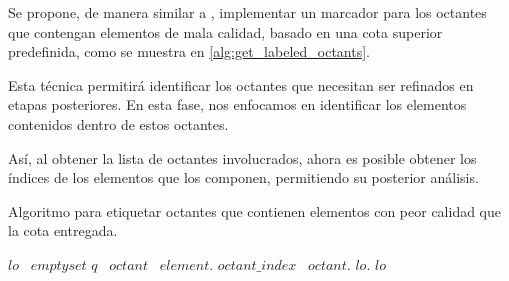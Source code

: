 %
%


Se propone, de manera similar a \cite{daines2018repairing}, implementar un marcador para los octantes que contengan elementos de mala calidad, basado en una cota superior predefinida, como se muestra en \autoref{alg:get_labeled_octants}.


Esta técnica permitirá identificar los octantes que necesitan ser refinados en etapas posteriores. En esta fase, nos enfocamos en identificar los elementos contenidos dentro de estos octantes.

Así, al obtener la lista de octantes involucrados, ahora es posible obtener los índices de los elementos que los componen, permitiendo su posterior análisis.


\begin{algorithm}
\caption{Algoritmo para etiquetar octantes que contienen elementos con peor calidad que la cota entregada.}\label{alg:get_labeled_octants} 
{
    $lo$ \gets \, $empty set$ \;
     {
        $q$ \gets \, \;
         {
            $octant$ \gets \, $element$.\getOctant{}\;
            $octant\_index$ \gets \, $octant$.\getIndex{}\;
            $lo$.\;
        }
    }
    \KwRet $lo$\;    
}
\end{algorithm}

